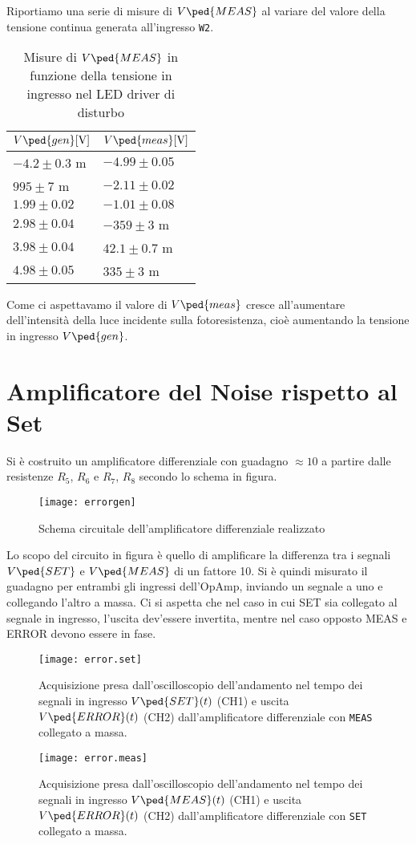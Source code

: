 \documentclass[10pt, a4paper, italian]{article}
\begin{document}
Riportiamo una serie di misure di $V\ped{MEAS}$ al variare del valore della
tensione continua generata all'ingresso \verb+W2+.
\begin{table}[htbp]
\centering
\begin{tabular}{@{}ll@{}}
\toprule
$V\ped{gen} [\si{\V}]$ & $V\ped{meas} [\si{\V}]$\\
\midrule
$-4.2 \pm 0.3$ m 	& $ -4.99 \pm 0.05$	\\
$995 \pm 7$ m 	& $ -2.11 \pm 0.02 $	\\
$1.99 \pm 0.02$ 	& $ -1.01 \pm 0.08 $\\
$2.98 \pm 0.04$ 	& $ -359 \pm 3 $ m\\
$3.98 \pm 0.04$ 	& $ 42.1 \pm 0.7 $ m\\
$4.98 \pm 0.05$ 	& $ 335 \pm 3$ m\\
\bottomrule
\end{tabular}
\caption{Misure di $V\ped{MEAS}$ in funzione della tensione in ingresso nel
LED driver di disturbo}
\end{table}
Come ci aspettavamo il valore di $V\ped{meas}$ cresce all'aumentare
dell'intensità della luce incidente sulla fotoresistenza, cioè aumentando la
tensione in ingresso $V\ped{gen}$.

\section{Amplificatore del Noise rispetto al Set}
Si è costruito un amplificatore differenziale con guadagno $\approx 10$ a
partire dalle resistenze $R_5$, $R_6$ e $R_7$, $R_8$ secondo lo schema in
figura.
\begin{figure}[htbp]
    \centering
	\texttt{[image: errorgen]}
    \caption{Schema circuitale dell'amplificatore differenziale realizzato
    \label{schm: errgen}}
\end{figure}
Lo scopo del circuito in figura è quello di amplificare la differenza tra i
segnali $V\ped{SET}$ e $V\ped{MEAS}$ di un fattore 10.
Si è quindi misurato il guadagno per entrambi gli ingressi dell'OpAmp,
inviando un segnale a uno e collegando l'altro a massa. Ci si aspetta che nel
caso in cui SET sia collegato al segnale in ingresso, l'uscita dev'essere
invertita, mentre nel caso opposto MEAS e ERROR devono essere in fase.
\begin{figure}[htbp]
    \centering
	\texttt{[image: error.set]}
    \caption{Acquisizione presa dall'oscilloscopio dell'andamento nel tempo dei
	segnali in ingresso $V\ped{SET} (t)$ (CH1) e uscita $V\ped{ERROR} (t)$ (CH2)
	dall'amplificatore differenziale con \texttt{MEAS} collegato a massa.
    \label{fig: errset}}
\end{figure}
\begin{figure}[htbp]
    \centering
	\texttt{[image: error.meas]}
    \caption{Acquisizione presa dall'oscilloscopio dell'andamento nel tempo dei
	segnali in ingresso $V\ped{MEAS} (t)$ (CH1) e uscita $V\ped{ERROR} (t)$ (CH2)
	dall'amplificatore differenziale con \texttt{SET} collegato a massa.
    \label{fig: errmeas}}
\end{figure}
\end{document}
